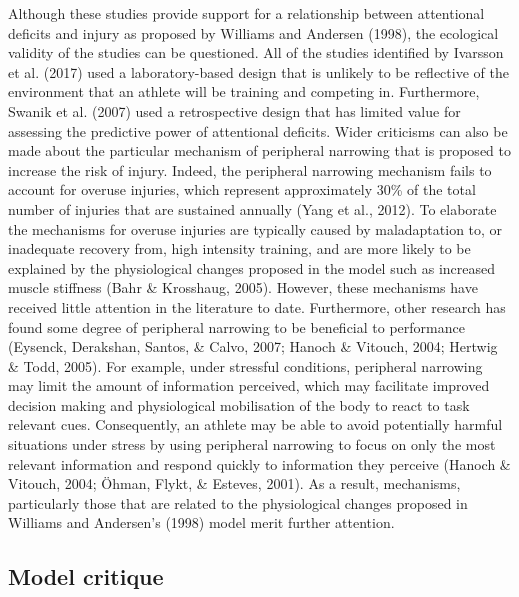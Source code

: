 \documentclass[
  english,
  man,floatsintext]{apa6}
\begin{document}
Although these studies provide support for a relationship between attentional deficits and injury as proposed by Williams and Andersen (1998), the ecological validity of the studies can be questioned.
All of the studies identified by Ivarsson et al. (2017) used a laboratory-based design that is unlikely to be reflective of the environment that an athlete will be training and competing in.
Furthermore, Swanik et al. (2007) used a retrospective design that has limited value for assessing the predictive power of attentional deficits.
Wider criticisms can also be made about the particular mechanism of peripheral narrowing that is proposed to increase the risk of injury.
Indeed, the peripheral narrowing mechanism fails to account for overuse injuries, which represent approximately 30\% of the total number of injuries that are sustained annually (Yang et al., 2012).
To elaborate the mechanisms for overuse injuries are typically caused by maladaptation to, or inadequate recovery from, high intensity training,
and are more likely to be explained by the physiological changes proposed in the model such as increased muscle stiffness (Bahr \& Krosshaug, 2005).
However, these mechanisms have received little attention in the literature to date.
Furthermore, other research has found some degree of peripheral narrowing to be beneficial to performance (Eysenck, Derakshan, Santos, \& Calvo, 2007; Hanoch \& Vitouch, 2004; Hertwig \& Todd, 2005).
For example, under stressful conditions, peripheral narrowing may limit the amount of information perceived, which may facilitate improved decision making and physiological mobilisation of the body to react to task relevant cues.
Consequently, an athlete may be able to avoid potentially harmful situations under stress by using peripheral narrowing to focus on only the most relevant information and respond quickly to information they perceive (Hanoch \& Vitouch, 2004; Öhman, Flykt, \& Esteves, 2001).
As a result, mechanisms, particularly those that are related to the physiological changes proposed in Williams and Andersen's (1998) model merit further attention.

\hypertarget{model-critique}{%
\subsection{Model critique}\label{model-critique}}
\end{document}
